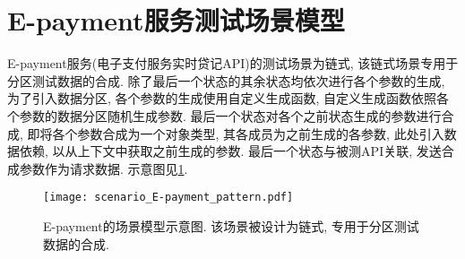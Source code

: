     \section{E-payment服务测试场景模型}
        E-payment服务(电子支付服务实时贷记API)的测试场景为链式, 该链式场景专用于分区测试数据的合成. 除了最后一个状态的其余状态均依次进行各个参数的生成, 为了引入数据分区, 各个参数的生成使用自定义生成函数, 自定义生成函数依照各个参数的数据分区随机生成参数. 最后一个状态对各个之前状态生成的参数进行合成, 即将各个参数合成为一个对象类型, 其各成员为之前生成的各参数, 此处引入数据依赖, 以从上下文中获取之前生成的参数. 最后一个状态与被测API关联, 发送合成参数作为请求数据. 示意图见\ref{fig:epayment_scenario}.
        
        \begin{figure}[!htb]
            \centering
            \texttt{[image: scenario\_E-payment\_pattern.pdf]}
            \caption{E-payment的场景模型示意图. 该场景被设计为链式, 专用于分区测试数据的合成.}
            \label{fig:epayment_scenario}
        \end{figure}
        
